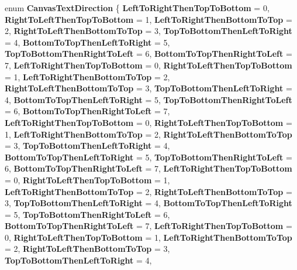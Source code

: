 \begin{DoxyCompactItemize}
enum {\bfseries Canvas\+Text\+Direction} \{ \newline
{\bfseries Left\+To\+Right\+Then\+Top\+To\+Bottom} = 0, 
{\bfseries Right\+To\+Left\+Then\+Top\+To\+Bottom} = 1, 
{\bfseries Left\+To\+Right\+Then\+Bottom\+To\+Top} = 2, 
{\bfseries Right\+To\+Left\+Then\+Bottom\+To\+Top} = 3, 
\newline
{\bfseries Top\+To\+Bottom\+Then\+Left\+To\+Right} = 4, 
{\bfseries Bottom\+To\+Top\+Then\+Left\+To\+Right} = 5, 
{\bfseries Top\+To\+Bottom\+Then\+Right\+To\+Left} = 6, 
{\bfseries Bottom\+To\+Top\+Then\+Right\+To\+Left} = 7, 
\newline
{\bfseries Left\+To\+Right\+Then\+Top\+To\+Bottom} = 0, 
{\bfseries Right\+To\+Left\+Then\+Top\+To\+Bottom} = 1, 
{\bfseries Left\+To\+Right\+Then\+Bottom\+To\+Top} = 2, 
{\bfseries Right\+To\+Left\+Then\+Bottom\+To\+Top} = 3, 
\newline
{\bfseries Top\+To\+Bottom\+Then\+Left\+To\+Right} = 4, 
{\bfseries Bottom\+To\+Top\+Then\+Left\+To\+Right} = 5, 
{\bfseries Top\+To\+Bottom\+Then\+Right\+To\+Left} = 6, 
{\bfseries Bottom\+To\+Top\+Then\+Right\+To\+Left} = 7, 
\newline
{\bfseries Left\+To\+Right\+Then\+Top\+To\+Bottom} = 0, 
{\bfseries Right\+To\+Left\+Then\+Top\+To\+Bottom} = 1, 
{\bfseries Left\+To\+Right\+Then\+Bottom\+To\+Top} = 2, 
{\bfseries Right\+To\+Left\+Then\+Bottom\+To\+Top} = 3, 
\newline
{\bfseries Top\+To\+Bottom\+Then\+Left\+To\+Right} = 4, 
{\bfseries Bottom\+To\+Top\+Then\+Left\+To\+Right} = 5, 
{\bfseries Top\+To\+Bottom\+Then\+Right\+To\+Left} = 6, 
{\bfseries Bottom\+To\+Top\+Then\+Right\+To\+Left} = 7, 
\newline
{\bfseries Left\+To\+Right\+Then\+Top\+To\+Bottom} = 0, 
{\bfseries Right\+To\+Left\+Then\+Top\+To\+Bottom} = 1, 
{\bfseries Left\+To\+Right\+Then\+Bottom\+To\+Top} = 2, 
{\bfseries Right\+To\+Left\+Then\+Bottom\+To\+Top} = 3, 
\newline
{\bfseries Top\+To\+Bottom\+Then\+Left\+To\+Right} = 4, 
{\bfseries Bottom\+To\+Top\+Then\+Left\+To\+Right} = 5, 
{\bfseries Top\+To\+Bottom\+Then\+Right\+To\+Left} = 6, 
{\bfseries Bottom\+To\+Top\+Then\+Right\+To\+Left} = 7, 
\newline
{\bfseries Left\+To\+Right\+Then\+Top\+To\+Bottom} = 0, 
{\bfseries Right\+To\+Left\+Then\+Top\+To\+Bottom} = 1, 
{\bfseries Left\+To\+Right\+Then\+Bottom\+To\+Top} = 2, 
{\bfseries Right\+To\+Left\+Then\+Bottom\+To\+Top} = 3, 
\newline
{\bfseries Top\+To\+Bottom\+Then\+Left\+To\+Right} = 4, 

\end{DoxyCompactItemize}
